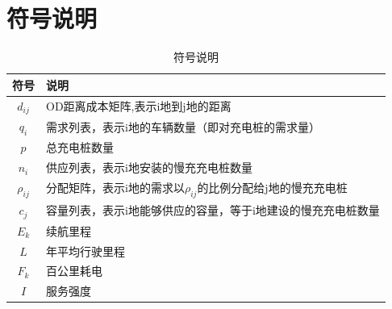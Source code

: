 \documentclass[12pt, a4paper, oneside]{ctexart}
\begin{document}
\section{符号说明}
\begin{table}[H]
    \caption{符号说明}
    \centering
    \renewcommand{\arraystretch}{2}
    \begin{tabular*}{\textwidth}{c||l}%
        \toprule[1.5mm]
        \Large{\textbf{符号}} & \Large{\textbf{说明}} \\
        \midrule[1.5pt]
        \(d_{ij}\) & OD距离成本矩阵,表示i地到j地的距离 \\\hline
        \(q_i\)&需求列表，表示i地的车辆数量（即对充电桩的需求量）\\\hline
        \(p\)&总充电桩数量\\\hline
        \(n_i\)&供应列表，表示i地安装的慢充充电桩数量\\\hline
        \(\rho_{ij}\)&分配矩阵，表示i地的需求以\(\rho_{ij}\)的比例分配给j地的慢充充电桩\\\hline
        \(c_j\)&容量列表，表示i地能够供应的容量，等于i地建设的慢充充电桩数量\\\hline
        \(E_k\)&续航里程\\\hline
        \(L\)&年平均行驶里程\\\hline
        \(F_k\)&百公里耗电\\\hline
        \(I\)&服务强度\\\hline
        \bottomrule[1mm]
    \end{tabular*}
\end{table}
\end{document}
